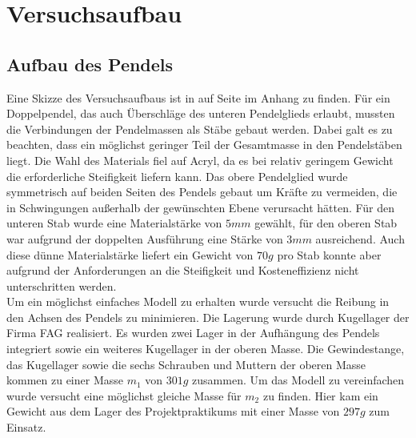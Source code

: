 \section{Versuchsaufbau}
\subsection{Aufbau des Pendels}
Eine Skizze des Versuchsaufbaus ist in auf Seite 
\pageref{pic:skizze_versuchsaufbau} im Anhang zu finden.
Für ein Doppelpendel, das auch Überschläge des unteren Pendelglieds erlaubt, mussten die Verbindungen der Pendelmassen als Stäbe gebaut werden. Dabei galt es zu beachten, dass ein möglichst geringer Teil der Gesamtmasse in den Pendelstäben liegt. Die Wahl des Materials fiel auf Acryl, da es bei relativ geringem Gewicht die erforderliche Steifigkeit liefern kann. Das obere Pendelglied wurde symmetrisch auf beiden Seiten des Pendels gebaut um Kräfte zu vermeiden, die in Schwingungen außerhalb der gewünschten Ebene verursacht hätten. Für den unteren Stab wurde eine Materialstärke von $5 mm$ gewählt, für den oberen Stab war aufgrund der doppelten Ausführung eine Stärke von $3 mm$ ausreichend.
Auch diese dünne Materialstärke liefert ein Gewicht von $70  g$ pro Stab konnte aber aufgrund der Anforderungen an die Steifigkeit und Kosteneffizienz nicht unterschritten werden.\\

Um ein möglichst einfaches Modell zu erhalten wurde versucht die Reibung in den Achsen des Pendels zu minimieren. Die Lagerung wurde durch Kugellager der Firma FAG realisiert. Es wurden zwei Lager in der Aufhängung des Pendels integriert sowie ein weiteres Kugellager in der oberen Masse.
Die Gewindestange, das Kugellager sowie die sechs Schrauben und Muttern der oberen Masse kommen zu einer Masse $ m_1$ von $301 g$ zusammen. Um das Modell zu vereinfachen wurde versucht eine möglichst gleiche Masse für $ m_2 $ zu finden. Hier kam ein Gewicht aus dem Lager des Projektpraktikums mit einer Masse von $297 g$ zum Einsatz.

